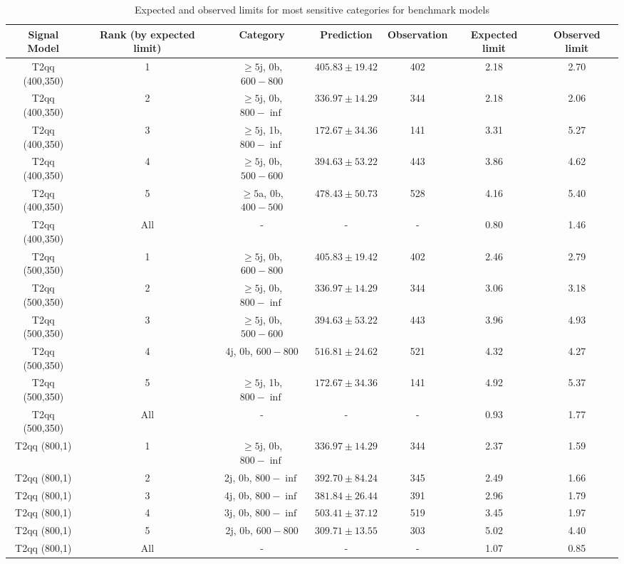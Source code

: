 \begin{landscape}
\begin{longtable}{ccccccc}
\caption{Expected and observed limits for most sensitive categories for benchmark models} \label{tab:benchMarkTable_T2qq} \\    \hline
Signal Model & Rank (by expected limit) & Category & Prediction & Observation & Expected limit & Observed limit\\ \hline
T2qq (400,350) & 1 & $\ge5$j, 0b, $600-800$ & $405.83 \pm 19.42$ & 402 & 2.18 & 2.70\\ 
T2qq (400,350) & 2 & $\ge5$j, 0b, $800-\inf$ & $336.97 \pm 14.29$ & 344 & 2.18 & 2.06\\ 
T2qq (400,350) & 3 & $\ge5$j, 1b, $800-\inf$ & $172.67 \pm 34.36$ & 141 & 3.31 & 5.27\\ 
T2qq (400,350) & 4 & $\ge5$j, 0b, $500-600$ & $394.63 \pm 53.22$ & 443 & 3.86 & 4.62\\ 
T2qq (400,350) & 5 & $\ge5$a, 0b, $400-500$ & $478.43 \pm 50.73$ & 528 & 4.16 & 5.40\\ 
T2qq (400,350) & All & - & - & - & 0.80 & 1.46\\ 
T2qq (500,350) & 1 & $\ge5$j, 0b, $600-800$ & $405.83 \pm 19.42$ & 402 & 2.46 & 2.79\\ 
T2qq (500,350) & 2 & $\ge5$j, 0b, $800-\inf$ & $336.97 \pm 14.29$ & 344 & 3.06 & 3.18\\ 
T2qq (500,350) & 3 & $\ge5$j, 0b, $500-600$ & $394.63 \pm 53.22$ & 443 & 3.96 & 4.93\\ 
T2qq (500,350) & 4 & 4j, 0b, $600-800$ & $516.81 \pm 24.62$ & 521 & 4.32 & 4.27\\ 
T2qq (500,350) & 5 & $\ge5$j, 1b, $800-\inf$ & $172.67 \pm 34.36$ & 141 & 4.92 & 5.37\\ 
T2qq (500,350) & All & - & - & - & 0.93 & 1.77\\ 
T2qq (800,1) & 1 & $\ge5$j, 0b, $800-\inf$ & $336.97 \pm 14.29$ & 344 & 2.37 & 1.59\\ 
T2qq (800,1) & 2 & 2j, 0b, $800-\inf$ & $392.70 \pm 84.24$ & 345 & 2.49 & 1.66\\ 
T2qq (800,1) & 3 & 4j, 0b, $800-\inf$ & $381.84 \pm 26.44$ & 391 & 2.96 & 1.79\\ 
T2qq (800,1) & 4 & 3j, 0b, $800-\inf$ & $503.41 \pm 37.12$ & 519 & 3.45 & 1.97\\ 
T2qq (800,1) & 5 & 2j, 0b, $600-800$ & $309.71 \pm 13.55$ & 303 & 5.02 & 4.40\\ 
T2qq (800,1) & All & - & - & - & 1.07 & 0.85\\ 
\hline
\hline
\end{longtable}
\end{landscape}
